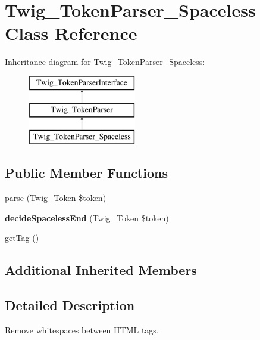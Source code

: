 \hypertarget{classTwig__TokenParser__Spaceless}{}\section{Twig\+\_\+\+Token\+Parser\+\_\+\+Spaceless Class Reference}
\label{classTwig__TokenParser__Spaceless}
Inheritance diagram for Twig\+\_\+\+Token\+Parser\+\_\+\+Spaceless\+:\begin{figure}[H]
\begin{center}
\leavevmode
\includegraphics[height=3.000000cm]{classTwig__TokenParser__Spaceless}
\end{center}
\end{figure}
\subsection*{Public Member Functions}
\begin{DoxyCompactItemize}
\item 
\hyperlink{classTwig__TokenParser__Spaceless_a3b24710f3d1c0940c37f8e155a13bf71}{parse} (\hyperlink{classTwig__Token}{Twig\+\_\+\+Token} \$token)
\item 
{\bfseries decide\+Spaceless\+End} (\hyperlink{classTwig__Token}{Twig\+\_\+\+Token} \$token)\hypertarget{classTwig__TokenParser__Spaceless_a097ac11e399049537b3d634f70dddd75}{}\label{classTwig__TokenParser__Spaceless_a097ac11e399049537b3d634f70dddd75}

\item 
\hyperlink{classTwig__TokenParser__Spaceless_abe2f41802bc34b8adfb3ddf27d5390e4}{get\+Tag} ()
\end{DoxyCompactItemize}
\subsection*{Additional Inherited Members}


\subsection{Detailed Description}
Remove whitespaces between H\+T\+ML tags.


